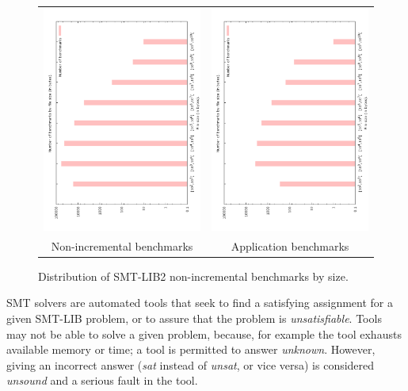 \documentclass[twoside,11pt]{article}
\begin{document}
\begin{figure}
\begin{center}
\begin{tabular}{cc}
\includegraphics[angle=270,width=.5\textwidth]{smtlib2-file-count-by-size.pdf}
&
\includegraphics[angle=270,width=.5\textwidth]{smtlib2-app-file-count-by-size.pdf}
\\
Non-incremental benchmarks & Application benchmarks
\end{tabular}
\end{center}
\caption{Distribution of SMT-LIB2 non-incremental benchmarks by size.
\label{fig:smtlib-bysize}}
\end{figure}

SMT solvers are automated tools that seek to find a satisfying assignment for a given SMT-LIB problem, or to assure that the problem is \textit{unsatisfiable}.
Tools may not be able to solve a given problem, because, for example the tool exhausts available memory or time; a tool is permitted to answer \textit{unknown}. However, giving an incorrect answer (\textit{sat} instead of \textit{unsat}, or vice versa) is considered \textit{unsound} and a serious fault in the tool.
\end{document}
